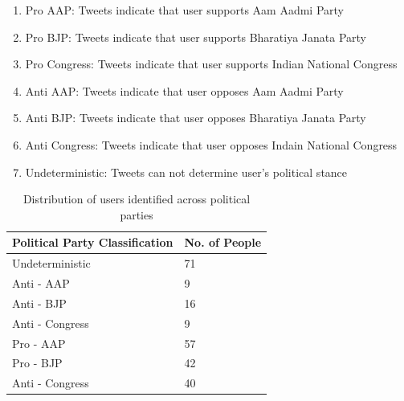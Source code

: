 \documentclass[a4paper,11pt]{article}
\begin{document}
\begin{enumerate}
    \item Pro AAP: Tweets indicate that user supports Aam Aadmi Party
    \item Pro BJP: Tweets indicate that user supports Bharatiya Janata Party
    \item Pro Congress: Tweets indicate that user supports Indian National Congress
    \item Anti AAP: Tweets indicate that user opposes Aam Aadmi Party
    \item Anti BJP: Tweets indicate that user opposes Bharatiya Janata Party
    \item Anti Congress: Tweets indicate that user opposes Indain National Congress
    \item Undeterministic: Tweets can not determine user's political stance
\end{enumerate}
\begin{table}[h]
\centering
\caption{Distribution of users identified across political parties} 
\begin{tabular}{|p{10cm}|p{2cm}|} 
\hline
 Political Party Classification & No. of People \\
 \hline \hline
 Undeterministic & 71 \\ 
 \hline
 Anti - AAP & 9 \\
\hline
 Anti - BJP & 16 \\
\hline
Anti - Congress & 9 \\
\hline
Pro - AAP & 57 \\
\hline
Pro - BJP & 42 \\
\hline
Anti - Congress & 40 \\
\hline
\end{tabular}
\label{tab:partyDistribution}
\end{table} 
\end{document}
